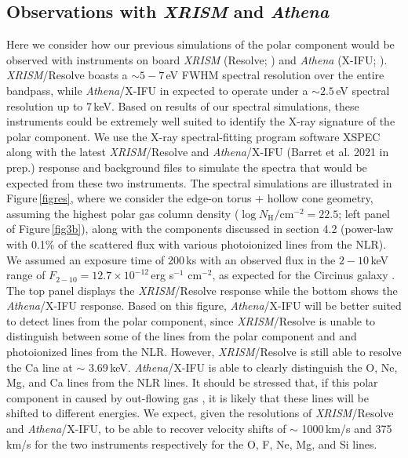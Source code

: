 \documentclass[fleqn,usenatbib]{mnras}
\begin{document}
        \subsection{Observations with \textit{XRISM} and \textit{Athena}}
        
            Here we consider how our previous simulations of the polar component would be observed with instruments on board \textit{XRISM} (Resolve; \citealp{xrismscienceteam2020science}) and \textit{Athena} (X-IFU; \citealp{2016SPIE.9905E..2FB}). \textit{XRISM}/Resolve boasts a $\sim 5-7$\,eV FWHM spectral resolution over the entire bandpass, while \textit{Athena}/X-IFU in expected to operate under a $\sim 2.5$\,eV spectral resolution up to 7\,keV. Based on results of our spectral simulations, these instruments could be extremely well suited to identify the X-ray signature of the polar component. We use the X-ray spectral-fitting program software \textsc{XSPEC} \citep{1996ASPC..101...17A} along with the latest \textit{XRISM}/Resolve and \textit{Athena}/X-IFU (Barret et al. 2021 in prep.) response and background files to simulate the spectra that would be expected from these two instruments. The spectral simulations are illustrated in Figure\,\ref{figres}, where we consider the edge-on torus + hollow cone geometry, assuming the highest polar gas column density ($\log{N_{\mathrm{H}}\big/\text{cm}^{-2}} = 22.5$; left panel of Figure\,\ref{fig3b}), along with the components discussed in section 4.2 (power-law with 0.1\% of the scattered flux with various photoionized lines from the NLR). We assumed an exposure time of 200\,ks with an observed flux in the $2-10$\,keV range of $F_{2-10} = 12.7\times10^{-12}$\,erg s$^{-1}$ cm$^{-2}$, as expected for the Circinus galaxy \citep{2017ApJS..233...17R}. The top panel displays the \textit{XRISM}/Resolve response while the bottom shows the \textit{Athena}/X-IFU response. Based on this figure, \textit{Athena}/X-IFU will be better suited to detect lines from the polar component, since \textit{XRISM}/Resolve is unable to distinguish between some of the lines from the polar component and and photoionized lines from the NLR. However, \textit{XRISM}/Resolve is still able to resolve the Ca line at $\sim$ 3.69\,keV. \textit{Athena}/X-IFU is able to clearly distinguish the O, Ne, Mg, and Ca lines from the NLR lines. It should be stressed that, if this polar component in caused by out-flowing gas \citep{Ricci2017, Leftley_2019, 2019ApJ...884..171H, 2020ApJ...900..174V}, it is likely that these lines will be shifted to different energies. We expect, given the resolutions of \textit{XRISM}/Resolve and \textit{Athena}/X-IFU, to be able to recover velocity shifts of $\sim$ 1000\,km/s and 375\,km/s for the two instruments respectively for the O, F, Ne, Mg, and Si lines.     
            
\end{document}
